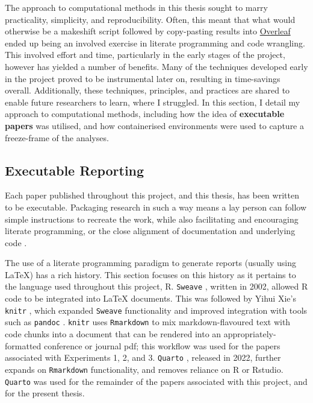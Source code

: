 \documentclass[../main.tex]{subfiles}
\begin{document}
The approach to computational methods in this thesis sought to marry
practicality, simplicity, and reproducibility. Often, this meant that
what would otherwise be a makeshift script followed by copy-pasting
results into \href{https://www.overleaf.com/}{Overleaf} ended up being
an involved exercise in literate programming \cite{knuth_1984} and code
wrangling. This involved effort and time, particularly in the early
stages of the project, however has yielded a number of benefits. Many of
the techniques developed early in the project proved to be instrumental
later on, resulting in time-savings overall. Additionally, these
techniques, principles, and practices are shared to enable future
researchers to learn, where I struggled. In this section, I detail my
approach to computational methods, including how the idea of
\textbf{executable papers} was utilised, and how containerised
environments were used to capture a freeze-frame of the analyses.

\subsection{Executable Reporting}\label{executable-reporting}

Each paper published throughout this project, and this thesis, has been
written to be executable. Packaging research in such a way means a lay
person can follow simple instructions to recreate the work, while also
facilitating and encouraging literate programming, or the close
alignment of documentation and underlying code \cite{piccolo_2016}.

The use of a literate programming paradigm to generate reports (usually
using LaTeX) has a rich history. This section focuses on this history as
it pertains to the language used throughout this project, R.
\texttt{Sweave} \cite{leisch_2002}, written in 2002, allowed R code to
be integrated into LaTeX documents. This was followed by Yihui Xie's
\texttt{knitr} \cite{xie_2015}, which expanded \texttt{Sweave}
functionality and improved integration with tools such as
\texttt{pandoc} \cite{pandoc}. \texttt{knitr} uses \texttt{Rmarkdown}
\cite{xie_2020} to mix markdown-flavoured text with code chunks into a
document that can be rendered into an appropriately-formatted conference
or journal pdf; this workflow was used for the papers associated with
Experiments 1, 2, and 3. \texttt{Quarto} \cite{allaire_2024}, released
in 2022, further expands on \texttt{Rmarkdown} functionality, and
removes reliance on R or Rstudio. \texttt{Quarto} was used for the
remainder of the papers associated with this project, and for the
present thesis.
\end{document}
